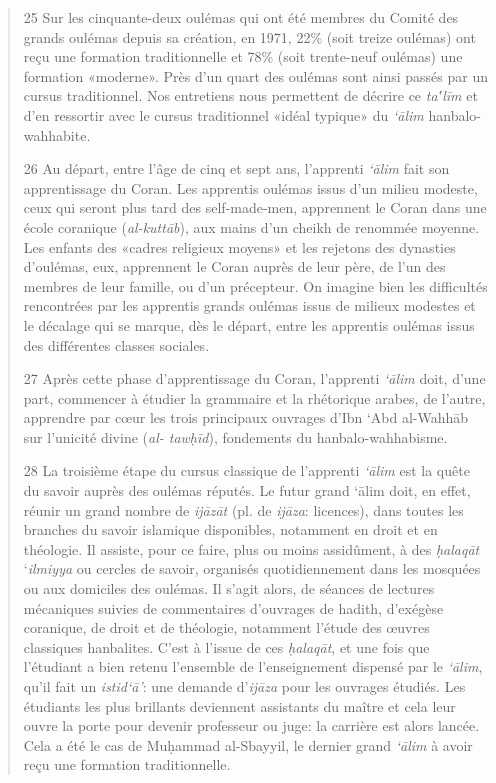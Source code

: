 \begin{quote}
25 Sur les cinquante-deux oulémas qui ont été membres du Comité des
grands oulémas depuis sa création, en 1971, 22\% (soit treize oulémas)
ont reçu une formation traditionnelle et 78\% (soit trente-neuf oulémas)
une formation «moderne». Près d'un quart des oulémas sont ainsi passés
par un cursus traditionnel. Nos entretiens nous permettent de décrire ce
\emph{ta‛līm} et d'en ressortir avec le cursus traditionnel «idéal
typique» du \emph{`ālim} hanbalo-wahhabite.

26 Au départ, entre l'âge de cinq et sept ans, l'apprenti \emph{`ālim}
fait son apprentissage du Coran. Les apprentis oulémas issus d'un milieu
modeste, ceux qui seront plus tard des self-made-men, apprennent le
Coran dans une école coranique (\emph{al-kuttāb}), aux mains d'un cheikh
de renommée moyenne. Les enfants des «cadres religieux moyens» et les
rejetons des dynasties d'oulémas, eux, apprennent le Coran auprès de
leur père, de l'un des membres de leur famille, ou d'un précepteur. On
imagine bien les difficultés rencontrées par les apprentis grands
oulémas issus de milieux modestes et le décalage qui se marque, dès le
départ, entre les apprentis oulémas issus des différentes classes
sociales.

27 Après cette phase d'apprentissage du Coran, l'apprenti \emph{`ālim}
doit, d'une part, commencer à étudier la grammaire et la rhétorique
arabes, de l'autre, apprendre par cœur les trois principaux ouvrages
d'Ibn `Abd al-Wahhāb sur l'unicité divine (\emph{al- tawḥīd}),
fondements du hanbalo-wahhabisme.

28 La troisième étape du cursus classique de l'apprenti \emph{`ālim} est
la quête du savoir
auprès des oulémas réputés. Le futur grand `ālim doit, en effet, réunir
un grand nombre de \emph{ijāzāt} (pl. de \emph{ijāza}: licences), dans
toutes les branches du savoir islamique disponibles, notamment en droit
et en théologie. Il assiste, pour ce faire, plus ou moins
assidûment, à des \emph{ḥalaqāt} `\emph{ilmiyya} ou cercles de savoir,
organisés quotidiennement dans les mosquées ou aux domiciles des
oulémas. Il s'agit alors, de séances de lectures mécaniques suivies de
commentaires d'ouvrages de hadith, d'exégèse coranique, de droit et de
théologie, notamment l'étude des œuvres classiques hanbalites. C'est à
l'issue de ces \emph{ḥalaqāt}, et une fois que l'étudiant a bien retenu
l'ensemble de l'enseignement dispensé par le \emph{`ālim}, qu'il fait un
\emph{istid`ā'}: une demande d'\emph{ijāza} pour les ouvrages étudiés.
Les étudiants les plus brillants deviennent assistants du maître et cela
leur ouvre la porte pour devenir professeur ou juge: la carrière est
alors lancée. Cela a été le cas de Muḥammad al-Sbayyil, le dernier grand
\emph{`ālim} à avoir reçu une formation traditionnelle.


\end{quote}
